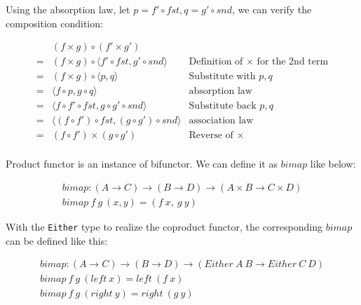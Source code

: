 \documentclass{article}
\begin{document}
\begin{mdframed}
Using the absorption law, let $p = f' \circ fst, q = g' \circ snd$, we can verify the composition condition:

\[
\begin{array}{cll}
  & (f \times g) \circ (f' \times g') & \\
= & (f \times g) \circ \langle f' \circ fst, g' \circ snd \rangle & \text{Definition of $\times$ for the 2nd term} \\
= & (f \times g) \circ \langle p, q \rangle & \text{Substitute with $p, q$} \\
= & \langle f \circ p, g \circ q \rangle & \text{absorption law} \\
= & \langle f \circ f' \circ fst, g \circ g' \circ snd \rangle & \text{Substitute back $p, q$} \\
= & \langle (f \circ f') \circ fst, (g \circ g') \circ snd \rangle & \text{association law} \\
= & (f \circ f') \times (g \circ g') & \text{Reverse of $\times$} \\
\end{array}
\]

\end{mdframed}

Product functor is an instance of bifunctor. We can define it as $bimap$ like below:

\[
\begin{array}{l}
bimap : (A \to C) \to (B \to D) \to (A \times B \to C \times D) \\
bimap\ f\ g\ (x, y) = (f\ x,\ g\ y)
\end{array}
\]

With the \texttt{Either} type to realize the coproduct functor, the corresponding $bimap$ can be defined like this:

\[
\begin{array}{l}
bimap : (A \to C) \to (B \to D) \to (Either\ A\ B \to Either\ C\ D) \\
bimap\ f\ g\ (left\ x) = left\ (f\ x) \\
bimap\ f\ g\ (right\ y) = right\ (g\ y)
\end{array}
\]

\begin{Exercise}
\end{Exercise}
\end{document}
